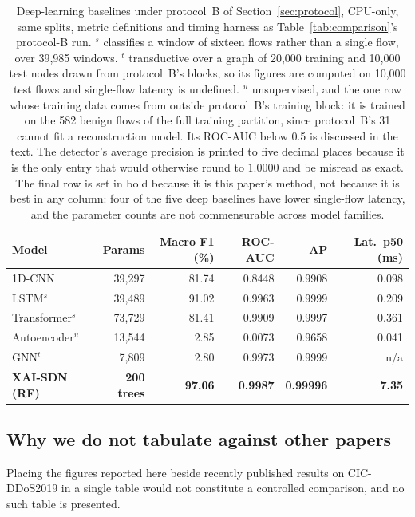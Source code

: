 \documentclass{ieeeaccess}
\begin{document}
\begin{table}[!t]
\caption{Deep-learning baselines under protocol~B of Section~\ref{sec:protocol},
CPU-only, same splits, metric definitions and timing harness as
Table~\ref{tab:comparison}'s protocol-B run. $^{s}$ classifies a window of
sixteen flows rather than a single flow, over 39,985 windows. $^{t}$ transductive
over a graph of 20,000 training and 10,000 test nodes drawn from protocol~B's
blocks, so its figures are computed on 10,000 test flows and single-flow latency
is undefined. $^{u}$ unsupervised, and the one row whose training data comes from
outside protocol~B's training block: it is trained on the 582 benign flows of the
full training partition, since protocol~B's 31 cannot fit a reconstruction model.
Its ROC-AUC below 0.5 is
discussed in the text. The detector's average precision is printed to five decimal
places because it is the only entry that would otherwise round to $1.0000$ and be
misread as exact. The final row is set in bold because it is this paper's method,
not because it is best in any column: four of the five deep baselines have lower
single-flow latency, and the parameter counts are not commensurable across model
families.}
\centering
\label{tab:deep}
\footnotesize
\setlength{\tabcolsep}{3pt}
\renewcommand{\arraystretch}{1.15}
\begin{tabular}{@{}lrrrrr@{}}
\toprule
\textbf{Model} & \textbf{Params} & \textbf{Macro F1 (\%)} & \textbf{ROC-AUC} &
\textbf{AP} & \textbf{Lat.\ p50 (ms)} \\
\midrule
1D-CNN               & 39,297 & 81.74 & 0.8448 & 0.9908 & 0.098 \\
LSTM$^{s}$           & 39,489 & 91.02 & 0.9963 & 0.9999 & 0.209 \\
Transformer$^{s}$    & 73,729 & 81.41 & 0.9909 & 0.9997 & 0.361 \\
Autoencoder$^{u}$    & 13,544 &  2.85 & 0.0073 & 0.9658 & 0.041 \\
GNN$^{t}$            &  7,809 &  2.80 & 0.9973 & 0.9999 & n/a \\
\midrule
\textbf{XAI-SDN (RF)} & \textbf{200 trees} & \textbf{97.06} & \textbf{0.9987} &
\textbf{0.99996} & \textbf{7.35} \\
\bottomrule
\end{tabular}
\end{table}

\subsection{Why we do not tabulate against other papers}
\label{sec:related_quant}
Placing the figures reported here beside recently published results on
CIC-DDoS2019 in a single table would not constitute a controlled comparison,
and no such table is presented.
\end{document}
